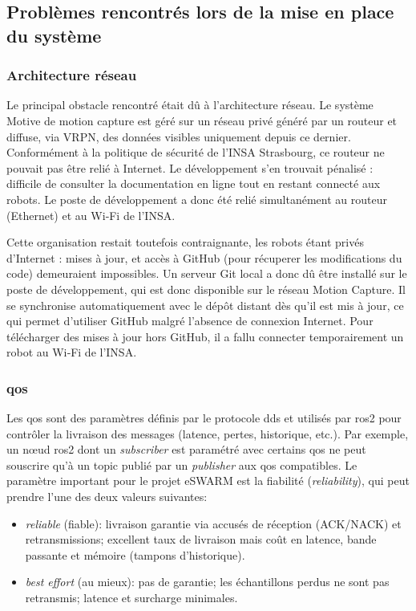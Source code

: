\subsection{Problèmes rencontrés lors de la mise en place du système}

\subsubsection{Architecture réseau}

Le principal obstacle rencontré était dû à l’architecture réseau. Le système Motive de motion capture est géré sur un réseau privé généré par un routeur et diffuse, via VRPN, des données visibles uniquement depuis ce dernier. Conformément à la politique de sécurité de l’INSA Strasbourg, ce routeur ne pouvait pas être relié à Internet. Le développement s’en trouvait pénalisé : difficile de consulter la documentation en ligne tout en restant connecté aux robots. Le poste de développement a donc été relié simultanément au routeur (Ethernet) et au Wi‑Fi de l’INSA.

Cette organisation restait toutefois contraignante, les robots étant privés d’Internet : mises à jour,  et accès à GitHub (pour récuperer les modifications du code) demeuraient impossibles. Un serveur Git local a donc dû être installé sur le poste de développement, qui est donc disponible sur le réseau Motion Capture. Il se synchronise automatiquement avec le dépôt distant dès qu’il est mis à jour, ce qui permet d’utiliser GitHub malgré l’absence de connexion Internet. Pour télécharger des mises à jour hors GitHub, il a fallu connecter temporairement un robot au Wi‑Fi de l’INSA.

\subsubsection{\gls{qos} \cite{noauthor_quality_nodate}}

Les \gls{qos} sont des paramètres définis par le protocole \gls{dds} et utilisés par \gls{ros2} pour contrôler la livraison des messages (latence, pertes, historique, etc.). Par exemple, un nœud \gls{ros2} dont un \textit{subscriber} est paramétré avec certains \gls{qos} ne peut souscrire qu’à un topic publié par un \textit{publisher} aux \gls{qos} compatibles. Le paramètre important pour le projet eSWARM est la fiabilité (\textit{reliability}), qui peut prendre l’une des deux valeurs suivantes:
\begin{itemize}
    \item \textit{reliable} (fiable): livraison garantie via accusés de réception (ACK/NACK) et retransmissions; excellent taux de livraison mais coût en latence, bande passante et mémoire (tampons d’historique).
    \item \textit{best effort} (au mieux): pas de garantie; les échantillons perdus ne sont pas retransmis; latence et surcharge minimales.
\end{itemize}

